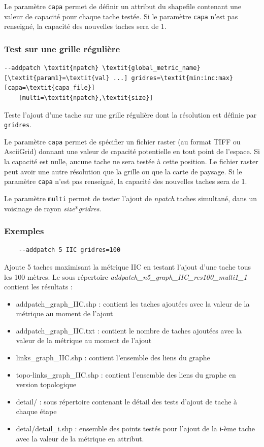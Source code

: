 \documentclass[a4paper,10pt]{report}
\begin{document}
Le paramètre \verb|capa| permet de définir un attribut du shapefile contenant une valeur de capacité pour chaque tache testée.
Si le paramètre \verb|capa| n'est pas renseigné, la capacité des nouvelles taches sera de 1.


\subsubsection{Test sur une grille régulière}
\begin{Verbatim}[commandchars=\\\{\}]
--addpatch \textit{npatch} \textit{global_metric_name} [\textit{param1}=\textit{val} ...] gridres=\textit{min:inc:max} [capa=\textit{capa_file}]
	[multi=\textit{npatch},\textit{size}]
\end{Verbatim}
Teste l'ajout d'une tache sur une grille régulière dont la résolution est définie par \verb|gridres|.

Le paramètre \verb|capa| permet de spécifier un fichier raster (au format TIFF ou AsciiGrid) donnant une valeur de capacité potentielle en tout point de l'espace. 
Si la capacité est nulle, aucune tache ne sera testée à cette position. Le fichier raster peut avoir une autre résolution que la grille ou que la carte de paysage.
Si le paramètre \verb|capa| n'est pas renseigné, la capacité des nouvelles taches sera de 1.

Le paramètre \verb|multi| permet de tester l'ajout de \textit{npatch} taches simultané, dans un voisinage de rayon \textit{size}*\textit{gridres}.

\subsubsection{Exemples}

\begin{Verbatim}
	--addpatch 5 IIC gridres=100
\end{Verbatim}

Ajoute 5 taches maximisant la métrique IIC en testant l'ajout d'une tache tous les 100 mètres.
Le sous répertoire \textit{addpatch\_n5\_graph\_IIC\_res100\_multi1\_1} contient les résultats :
\begin{itemize}
 \item addpatch\_graph\_IIC.shp : contient les taches ajoutées avec la valeur de la métrique au moment de l'ajout
 \item addpatch\_graph\_IIC.txt : contient le nombre de taches ajoutées avec la valeur de la métrique au moment de l'ajout
 \item links\_graph\_IIC.shp : contient l'ensemble des liens du graphe
 \item topo-links\_graph\_IIC.shp : contient l'ensemble des liens du graphe en version topologique
 \item detail/ : sous répertoire contenant le détail des tests d'ajout de tache à chaque étape
 \item detal/detail\_i.shp : ensemble des points testés pour l'ajout de la i-ème tache avec la valeur de la métrique en attribut.
\end{itemize}
\end{document}
